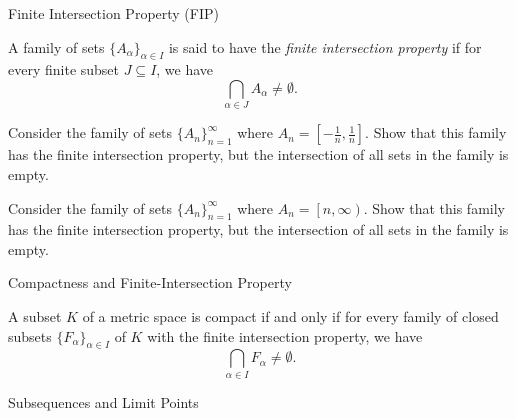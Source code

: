 \documentclass[12pt, a4paper]{article}
\begin{document}
\FrontPage
\Large

\begin{heading}
    Finite Intersection Property (FIP)
\end{heading}

\vspace{10pt}

\begin{definition}
    A family of sets $\{A_\alpha\}_{\alpha \in I}$ is said to have the \textit{finite intersection property} if for every finite subset $J \subseteq I$, we have
    \[
        \bigcap_{\alpha \in J} A_\alpha \neq \emptyset.
    \]
\end{definition}

\clearpage

\begin{problem}
    Consider the family of sets $\{A_n\}_{n=1}^\infty$ where $A_n = \left[-\frac{1}{n}, \frac{1}{n}\right]$. Show that this family has the finite intersection property, but the intersection of all sets in the family is empty.
    
\end{problem}

\clearpage

\begin{problem}
    Consider the family of sets $\{A_n\}_{n=1}^\infty$ where $A_n = \left[n, \infty\right)$. Show that this family has the finite intersection property, but the intersection of all sets in the family is empty.
    
\end{problem}

\clearpage

\begin{heading}
    Compactness and Finite-Intersection Property
\end{heading}

\vspace{10pt}

\begin{theorem}
    A subset $K$ of a metric space is compact if and only if for every family of closed subsets $\{F_\alpha\}_{\alpha \in I}$ of $K$ with the finite intersection property, we have
    \[
        \bigcap_{\alpha \in I} F_\alpha \neq \emptyset.
    \]
\end{theorem}

\clearpage

\begin{heading}
    Subsequences and Limit Points
\end{heading}
\end{document}
